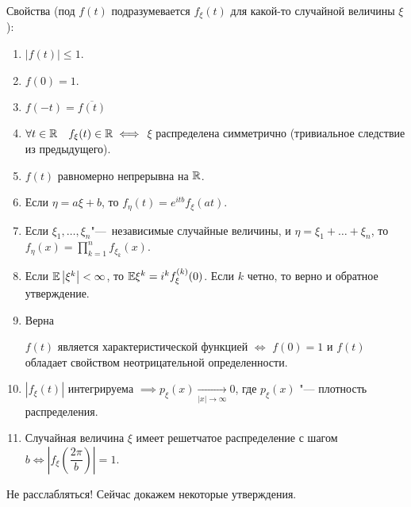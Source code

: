 \documentclass[../TV&MS.tex]{subfiles}
\begin{document}
	Свойства (под $f(t)$ подразумевается $f_\xi(t)$ для какой-то случайной величины $\xi$):

\begin{enumerate}
    \item $ \left| f(t) \right| \leqslant 1 $.
    \item $f(0) = 1$.
    \item $f(-t) = \overline{f(t)}$ 
    \item $\forall t \in \mathbb{R} \quad f_\xi(t) \in \mathbb{R} \iff$  $\xi$ распределена симметрично 
    (тривиальное следствие из предыдущего).

    \item\label{ravnepr} $f(t)$ равномерно непрерывна на $\mathbb{R}$.
    \item Если $\eta = a\xi + b$, то $f_\eta(t) = e^{itb}f_\xi(at)$.
    \item\label{nez} Если $\xi_1,  \ldots , \xi_n$"---~независимые случайные величины, и 
    $\eta = \xi_1 +  \ldots + \xi_n$, то $f_\eta(x) = \prod\limits_{k=1}^{n} f_{\xi_k}(x)$.
    
    \item\label{moments} Если $\mathbb{E} \left|\xi^k\right| < \infty$, то 
    $\mathbb{E} \xi^k = i^k f^{(k)}_\xi(0)$. Если $k$ четно, то верно и обратное утверждение.
    
    \item Верна
    \begin{Th}
       $f(t)$ является характеристической функцией $\iff$ $f(0) = 1$ 
       и  $f(t)$ обладает свойством неотрицательной определенности.
    \end{Th}

    \item $ \left| f_\xi(t) \right|$ интегрируема 
    $\implies p_\xi(x) \xrightarrow[ \left| x \right| \rightarrow \infty]{} 0$,
    где $p_\xi(x)$ "--- плотность распределения.
    
    \item Случайная величина $\xi$ имеет решетчатое распределение с шагом
    $b \iff \left| f_\xi \left( \dfrac{2\pi}{b} \right) \right| = 1$. 
\end{enumerate}

	Не расслабляться! Сейчас докажем некоторые утверждения.
\end{document}
